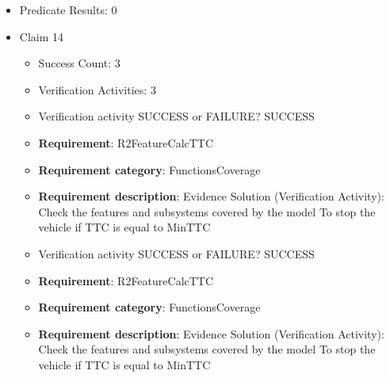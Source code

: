 \documentclass{article}
\begin{document}
\begin{itemize}
\begin{itemize}
						\item \textbf{Requirement}: R1FeatureControlPedal 
						\item \textbf{Requirement category}: FunctionsCoverage 
						\item \textbf{Requirement description}: Evidence Solution (Verification Activity): Check the features and subsystems covered by the model  To prevent collision when obstacle is detected
					
					\item Verification activity SUCCESS or FAILURE? SUCCESS
		
						\item \textbf{Requirement}: R1FeatureControlPedal 
						\item \textbf{Requirement category}: FunctionsCoverage 
						\item \textbf{Requirement description}: Evidence Solution (Verification Activity): Check the features and subsystems covered by the model  To prevent collision when obstacle is detected
					
				\end{itemize}
				
									    
				\item Predicate Results: 0

  				  \item Claim 14
				\begin{itemize}
			    	\item Success Count: 3 
			    	\item Verification Activities: 3
					\item Verification activity SUCCESS or FAILURE? SUCCESS
		
						\item \textbf{Requirement}: R2FeatureCalcTTC 
						\item \textbf{Requirement category}: FunctionsCoverage 
						\item \textbf{Requirement description}: Evidence Solution (Verification Activity): Check the features and subsystems covered by the model  To stop the vehicle if TTC is equal to MinTTC
					
					\item Verification activity SUCCESS or FAILURE? SUCCESS
		
						\item \textbf{Requirement}: R2FeatureCalcTTC 
						\item \textbf{Requirement category}: FunctionsCoverage 
						\item \textbf{Requirement description}: Evidence Solution (Verification Activity): Check the features and subsystems covered by the model  To stop the vehicle if TTC is equal to MinTTC
					

\end{itemize}
\end{itemize}
\end{document}
